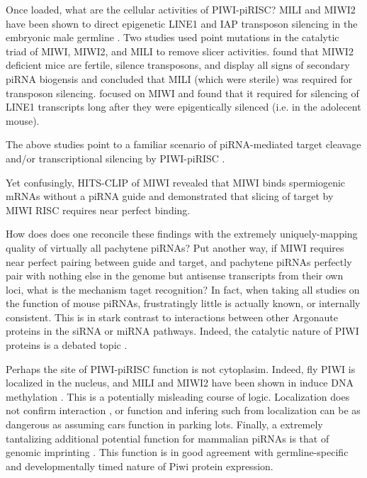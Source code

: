     Once loaded, what are the cellular activities of PIWI-piRISC? MILI and MIWI2 have been shown to direct epigenetic LINE1 and IAP transposon silencing in the embryonic male germline \citep{Aravin2007,Carmell2007,Kuramochi-Miyagawa2008}. Two studies \citep{DeFazio2011,Reuter2011} used point mutations in the catalytic triad of MIWI, MIWI2, and MILI to remove slicer activities. \citet{DeFazio2011} found that MIWI2 deficient mice are fertile, silence transposons, and display all signs of secondary piRNA biogensis and concluded that MILI (which were sterile) was required for transposon silencing. \citet{Reuter2011} focused on MIWI and found that it required for silencing of LINE1 transcripts long after they were epigentically silenced (i.e. in the adolecent mouse).

    The above studies point to a familiar scenario of piRNA-mediated target cleavage and/or transcriptional silencing by PIWI-piRISC \citep{Meister2013}. 
    
    Yet confusingly, HITS-CLIP of MIWI revealed that MIWI binds spermiogenic mRNAs without a piRNA guide \citep{Vourekas2012} and \citet{Reuter2011} demonstrated that slicing of target by MIWI RISC requires near perfect binding.
    
    How does does one reconcile these findings with the extremely uniquely-mapping quality of virtually all pachytene piRNAs? Put another way, if MIWI requires near perfect pairing between guide and target, and pachytene piRNAs perfectly pair with nothing else in the genome but antisense transcripts from their own loci, what is the mechanism taget recognition? In fact, when taking all studies on the function of mouse piRNAs, frustratingly little is actually known, or internally consistent. This is in stark contrast to interactions between other Argonaute proteins in the siRNA or miRNA pathways. Indeed, the catalytic nature of PIWI proteins is a debated topic \citep{Luteijn2013,Meister2013}.

    Perhaps the site of PIWI-piRISC function is not cytoplasim. Indeed, fly PIWI is localized in the nucleus, and MILI and MIWI2 have been shown in induce DNA methylation \citep{Cox2000,Aravin2008}. This is a potentially misleading course of logic. Localization does not confirm interaction \citep{North2006}, or function and infering such from localization can be as dangerous as assuming cars function in parking lots. Finally, a extremely tantalizing additional potential function for mammalian piRNAs is that of genomic imprinting \citep{Watanabe2011}. This function is in good agreement with germline-specific and developmentally timed nature of Piwi protein expression.

